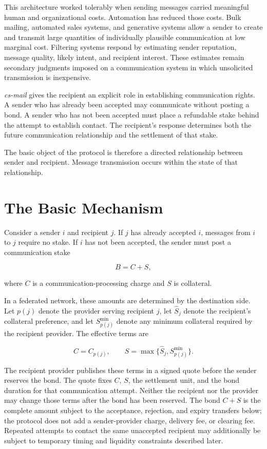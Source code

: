 \documentclass[11pt]{article}
\begin{document}
This architecture worked tolerably when sending messages carried meaningful human and organizational costs. Automation has reduced those costs. Bulk mailing, automated sales systems, and generative systems allow a sender to create and transmit large quantities of individually plausible communication at low marginal cost. Filtering systems respond by estimating sender reputation, message quality, likely intent, and recipient interest. These estimates remain secondary judgments imposed on a communication system in which unsolicited transmission is inexpensive.

\textit{cs-mail} gives the recipient an explicit role in establishing communication rights. A sender who has already been accepted may communicate without posting a bond. A sender who has not been accepted must place a refundable stake behind the attempt to establish contact. The recipient's response determines both the future communication relationship and the settlement of that stake.

The basic object of the protocol is therefore a directed relationship between sender and recipient. Message transmission occurs within the state of that relationship.

\section{The Basic Mechanism}

Consider a sender $i$ and recipient $j$. If $j$ has already accepted $i$, messages from $i$ to $j$ require no stake. If $i$ has not been accepted, the sender must post a communication stake

\begin{equation}
B = C + S,
\end{equation}

where $C$ is a communication-processing charge and $S$ is collateral.

In a federated network, these amounts are determined by the destination side. Let $p(j)$ denote the provider serving recipient $j$, let $\widehat S_j$ denote the recipient's collateral preference, and let $S^{\min}_{p(j)}$ denote any minimum collateral required by the recipient provider. The effective terms are

\begin{equation}
C=C_{p(j)},
\qquad
S=\max\{\widehat S_j,S^{\min}_{p(j)}\}.
\end{equation}

The recipient provider publishes these terms in a signed quote before the sender reserves the bond. The quote fixes $C$, $S$, the settlement unit, and the bond duration for that communication attempt. Neither the recipient nor the provider may change those terms after the bond has been reserved. The bond $C+S$ is the complete amount subject to the acceptance, rejection, and expiry transfers below; the protocol does not add a sender-provider charge, delivery fee, or clearing fee. Repeated attempts to contact the same unaccepted recipient may additionally be subject to temporary timing and liquidity constraints described later.
\end{document}

